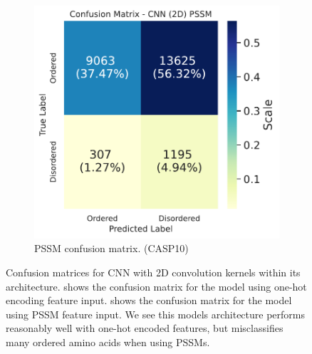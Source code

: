 \documentclass{l4proj}
\begin{document}
\begin{figure}[!htb]
\begin{subfigure}[b]{0.48\textwidth}
        \includegraphics[width=\textwidth]{images/confmats/CASP10CNN2Dpssm-cf.pdf}
        \caption{PSSM confusion matrix. (CASP10)}
        \label{fig:caspcf2dpssm}
    \end{subfigure}
    \caption{Confusion matrices for CNN with 2D convolution kernels within its architecture.  shows the confusion matrix for the model using one-hot encoding feature input.  shows the confusion matrix for the model using PSSM feature input. We see this models architecture performs reasonably well with one-hot encoded features, but misclassifies many ordered amino acids when using PSSMs.}
    \label{fig:caspcf2d}
\end{figure}
\end{document}
